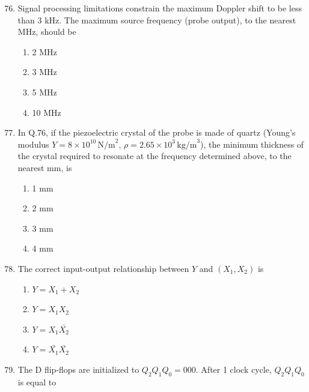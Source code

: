 \documentclass[journal]{IEEEtran}
\begin{document}
\begin{enumerate}
\setcounter{enumi}{75}

\item 
Signal processing limitations constrain the maximum Doppler shift to be less than 3 kHz. The maximum source frequency (probe output), to the nearest MHz, should be  

\begin{multicols}{2}
\begin{enumerate}
\item 2 MHz  
\item 3 MHz  
\item 5 MHz  
\item 10 MHz  
\end{enumerate}
\end{multicols}


\item 
In Q.76, if the piezoelectric crystal of the probe is made of quartz (Young's modulus $Y=8\times10^{10}\,\text{N/m}^2$, $\rho = 2.65\times10^3\,\text{kg/m}^3$), the minimum thickness of the crystal required to resonate at the frequency determined above, to the nearest mm, is  

\begin{multicols}{2}
\begin{enumerate}
\item 1 mm  
\item 2 mm  
\item 3 mm  
\item 4 mm  
\end{enumerate}
\end{multicols}


\item 
The correct input-output relationship between $Y$ and $(X_1,X_2)$ is  

\begin{multicols}{2}
\begin{enumerate}
\item $Y = X_1 + X_2$  
\item $Y = X_1 X_2$  
\item $Y = X_1 \bar{X_2}$  
\item $Y = \bar{X_1} \bar{X_2}$  
\end{enumerate}
\end{multicols}


\item 
The D flip-flops are initialized to $Q_2 Q_1 Q_0 = 000$. After 1 clock cycle, $Q_2 Q_1 Q_0$ is equal to  


\end{enumerate}
\end{document}
